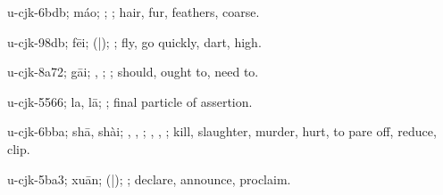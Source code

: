 \begin{multicols}{2}
{\cjkgGlue{}u-cjk-6bdb; máo; \cjkgGlue{}; \cjkgGlue{}; hair, fur, feathers, coarse.

\cjkgGlue{}u-cjk-98db; fēi; \cjkgGlue{}\cjkgGlue{}(\cjkgGlue{}|\cjkgGlue{}); \cjkgGlue{}; fly, go quickly, dart, high.

\cjkgGlue{}u-cjk-8a72; gāi; \cjkgGlue{}, \cjkgGlue{}; \cjkgGlue{}; should, ought to, need to.

\cjkgGlue{}u-cjk-5566; la, lā; \cjkgGlue{}; final particle of assertion.

\cjkgGlue{}u-cjk-6bba; shā, shài; \cjkgGlue{}\cjkgGlue{}\cjkgGlue{}, \cjkgGlue{}\cjkgGlue{}\cjkgGlue{}, \cjkgGlue{}\cjkgGlue{}\cjkgGlue{}; \cjkgGlue{}, \cjkgGlue{}, \cjkgGlue{}; kill, slaughter, murder, hurt, to pare off, reduce, clip.

\cjkgGlue{}u-cjk-5ba3; xuān; \cjkgGlue{}\cjkgGlue{}(\cjkgGlue{}|\cjkgGlue{}); \cjkgGlue{}; declare, announce, proclaim.

}
\end{multicols}
